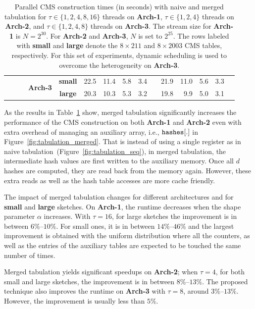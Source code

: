 \documentclass[10pt, review=true,sigconf]{acmart}
\begin{document}
\begin{table}[htbp]
{\begin{tabular}{ccccc||rrrrr|rrrrr}
&&&\multirow{2}{*}{\textbf{Arch-3}} & \textbf{small}  & 22.5    & 11.4   & 5.8   & 3.4   &    & 21.9    & 11.0    & 5.6   & 3.3   &    \\
&&&& \textbf{large} &  20.3 & 10.3  &  5.3  &  3.2 &    &  19.8 & 9.9 & 5.0& 3.1	&  \\        

\end{tabular}
}
\caption{Parallel CMS construction times (in seconds) with naive and merged tabulation for $\tau \in \{1, 2, 4, 8, 16\}$ threads on \textbf{Arch-1},  $\tau \in \{1, 2, 4\}$ threads on \textbf{Arch-2}, and $\tau \in \{1, 2, 4, 8\}$ threads on \textbf{Arch-3}. The stream size for \textbf{Arch-1} is $N = 2^{30}$. For \textbf{Arch-2} and \textbf{Arch-3}, $N$ is set to $2^{25}$. The rows labeled with {\bf small} and {\bf large} denote the $8 \times 211$ and $8 \times 2003$ CMS tables, respectively. For this set of experiments, dynamic scheduling is used to overcome the heterogeneity on \textbf{Arch-3}.} \label{tbl:mergedtbl}

\end{table}

As the results in Table~\ref{tbl:mergedtbl} show, merged tabulation significantly increases the performance of the CMS construction on both \textbf{Arch-1} and  \textbf{Arch-2} even with extra overhead of managing an auxiliary array, i.e., $\tt hashes[.]$ in Figure~\ref{fig:tabulation_merged}. That is instead of using a single register as in naive tabulation~(Figure~\ref{fig:tabulation_seq}), in merged tabulation, the intermediate hash values are first written to the auxiliary memory. Once all $d$ hashes are computed, they are read back from the memory again. However, these extra reads as well as the hash table accesses are more cache friendly.

The impact of merged tabulation changes for different architectures and for {\bf small} and {\bf large} sketches. On {\bf Arch-1}, the runtime decreases when the shape parameter $\alpha$ increases. With $\tau = 16$, for large sketches the improvement is in between $6\%$--$10\%$. For small ones, it is in between $14\%$--$46\%$ and the largest improvement is obtained with the uniform distribution where all the counters, as well as the entries of the auxiliary tables are expected to be touched the same number of times. 

Merged tabulation yields significant speedups on {\bf Arch-2}; when $\tau = 4$, for both small and large sketches, the improvement is in between $8\%$--$13\%$. The proposed technique also improves the runtime on {\bf Arch-3} with $\tau = 8$, around $3\%$--$13\%$. However, the improvement is usually less than $5\%$. 
\end{document}

